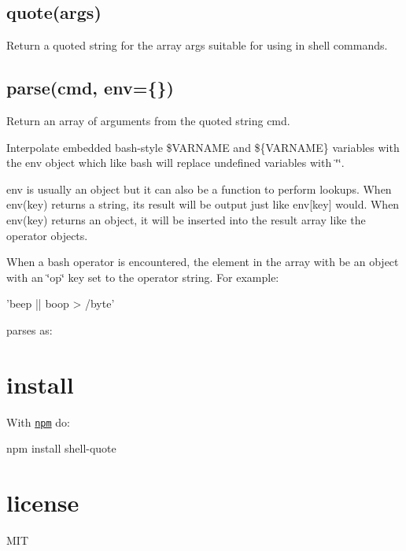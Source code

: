 \subsection*{quote(args)}

Return a quoted string for the array {\ttfamily args} suitable for using in shell commands.

\subsection*{parse(cmd, env=\{\})}

Return an array of arguments from the quoted string {\ttfamily cmd}.

Interpolate embedded bash-\/style {\ttfamily \$\+V\+A\+R\+N\+A\+ME} and {\ttfamily \$\{V\+A\+R\+N\+A\+ME\}} variables with the {\ttfamily env} object which like bash will replace undefined variables with {\ttfamily \char`\"{}\char`\"{}}.

{\ttfamily env} is usually an object but it can also be a function to perform lookups. When {\ttfamily env(key)} returns a string, its result will be output just like {\ttfamily env\mbox{[}key\mbox{]}} would. When {\ttfamily env(key)} returns an object, it will be inserted into the result array like the operator objects.

When a bash operator is encountered, the element in the array with be an object with an {\ttfamily \char`\"{}op\char`\"{}} key set to the operator string. For example\+:


\begin{DoxyCode}
'beep || boop > /byte'
\end{DoxyCode}


parses as\+:


\begin{DoxyCode}
\end{DoxyCode}


\section*{install}

With \href{http://npmjs.org}{\tt npm} do\+:


\begin{DoxyCode}
npm install shell-quote
\end{DoxyCode}


\section*{license}

M\+IT 